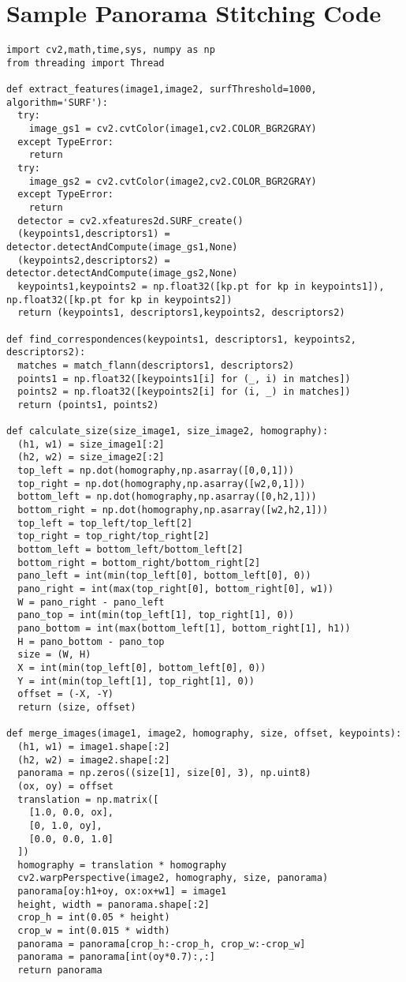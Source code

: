 \section{Sample Panorama Stitching Code}
\begin{lstlisting}
import cv2,math,time,sys, numpy as np
from threading import Thread

def extract_features(image1,image2, surfThreshold=1000, algorithm='SURF'):
  try:
    image_gs1 = cv2.cvtColor(image1,cv2.COLOR_BGR2GRAY)
  except TypeError:
    return
  try:
    image_gs2 = cv2.cvtColor(image2,cv2.COLOR_BGR2GRAY)
  except TypeError:
    return
  detector = cv2.xfeatures2d.SURF_create()
  (keypoints1,descriptors1) = detector.detectAndCompute(image_gs1,None)
  (keypoints2,descriptors2) = detector.detectAndCompute(image_gs2,None)
  keypoints1,keypoints2 = np.float32([kp.pt for kp in keypoints1]), np.float32([kp.pt for kp in keypoints2])
  return (keypoints1, descriptors1,keypoints2, descriptors2)

def find_correspondences(keypoints1, descriptors1, keypoints2, descriptors2):
  matches = match_flann(descriptors1, descriptors2)
  points1 = np.float32([keypoints1[i] for (_, i) in matches])
  points2 = np.float32([keypoints2[i] for (i, _) in matches])
  return (points1, points2)

def calculate_size(size_image1, size_image2, homography):
  (h1, w1) = size_image1[:2]
  (h2, w2) = size_image2[:2]
  top_left = np.dot(homography,np.asarray([0,0,1]))
  top_right = np.dot(homography,np.asarray([w2,0,1]))
  bottom_left = np.dot(homography,np.asarray([0,h2,1]))
  bottom_right = np.dot(homography,np.asarray([w2,h2,1]))
  top_left = top_left/top_left[2]
  top_right = top_right/top_right[2]
  bottom_left = bottom_left/bottom_left[2]
  bottom_right = bottom_right/bottom_right[2]
  pano_left = int(min(top_left[0], bottom_left[0], 0))
  pano_right = int(max(top_right[0], bottom_right[0], w1))
  W = pano_right - pano_left
  pano_top = int(min(top_left[1], top_right[1], 0))
  pano_bottom = int(max(bottom_left[1], bottom_right[1], h1))
  H = pano_bottom - pano_top
  size = (W, H)
  X = int(min(top_left[0], bottom_left[0], 0))
  Y = int(min(top_left[1], top_right[1], 0))
  offset = (-X, -Y)
  return (size, offset)

def merge_images(image1, image2, homography, size, offset, keypoints):
  (h1, w1) = image1.shape[:2]
  (h2, w2) = image2.shape[:2]
  panorama = np.zeros((size[1], size[0], 3), np.uint8)
  (ox, oy) = offset
  translation = np.matrix([
    [1.0, 0.0, ox],
    [0, 1.0, oy],
    [0.0, 0.0, 1.0]
  ])
  homography = translation * homography
  cv2.warpPerspective(image2, homography, size, panorama)
  panorama[oy:h1+oy, ox:ox+w1] = image1
  height, width = panorama.shape[:2]
  crop_h = int(0.05 * height)
  crop_w = int(0.015 * width)
  panorama = panorama[crop_h:-crop_h, crop_w:-crop_w]
  panorama = panorama[int(oy*0.7):,:]
  return panorama


\end{lstlisting}
